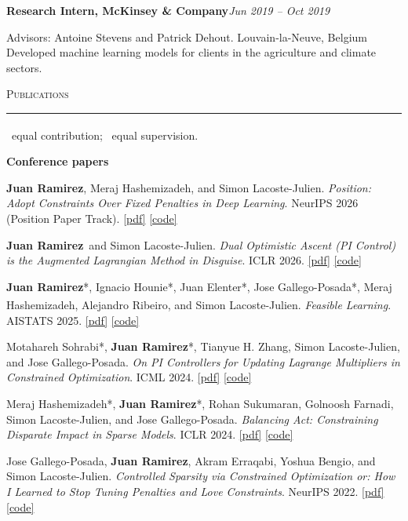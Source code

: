 \documentclass[11pt,letterpaper]{article}
\newcommand{\me}{\textbf{Juan Ramirez}}
\newcommand{\eqc}{*}                        %
\newcommand{\eqs}{\textsuperscript{\dag}}   %
\newcommand{\entry}[3]{%
  \par\addvspace{0.45em}%
  {\noindent\textbf{#1}\hfill\textit{#2}\par}%
  \nobreak\addvspace{0.1em}%
  {\noindent #3\par}%
}
\newcommand{\cvsection}[1]{%
  \par\addvspace{1.1em}%
  \Needspace{4\baselineskip}%
  {\noindent\large\scshape #1\par}%
  \nobreak\vspace{-0.55em}%
  {\noindent\color{rulegray}\rule{\textwidth}{0.4pt}\par}%
  \nobreak\addvspace{0.45em}%
}
\begin{document}
\entry{Research Intern, McKinsey \& Company}{Jun 2019 – Oct 2019}{Advisors: Antoine Stevens and Patrick Dehout. \hfill Louvain-la-Neuve, Belgium \\
Developed machine learning models for clients in the agriculture and climate sectors.}

\cvsection{Publications}

{\small \eqc\ equal contribution; \eqs\ equal supervision.\par}

\textbf{Conference papers}
\begin{enumerate}[label={[C\arabic*]}]
  \item \me, Meraj Hashemizadeh, and Simon Lacoste-Julien. \emph{Position: Adopt Constraints Over Fixed Penalties in Deep Learning}. NeurIPS 2026 (Position Paper Track). \href{https://arxiv.org/abs/2505.20628}{[pdf]} \href{https://github.com/merajhashemi/constraints-vs-penalties}{[code]}
  \item \me\ and Simon Lacoste-Julien. \emph{Dual Optimistic Ascent (PI Control) is the Augmented Lagrangian Method in Disguise}. ICLR 2026. \href{https://arxiv.org/abs/2509.22500}{[pdf]} \href{https://github.com/juan43ramirez/pi-control-is-alm}{[code]}
  \item \me\eqc, Ignacio Hounie\eqc, Juan Elenter\eqc, Jose Gallego-Posada\eqc, Meraj Hashemizadeh, Alejandro Ribeiro\eqs, and Simon Lacoste-Julien\eqs. \emph{Feasible Learning}. AISTATS 2025. \href{https://arxiv.org/abs/2501.14912}{[pdf]} \href{https://github.com/juan43ramirez/feasible-learning}{[code]}
  \item Motahareh Sohrabi\eqc, \me\eqc, Tianyue H. Zhang, Simon Lacoste-Julien, and Jose Gallego-Posada. \emph{On PI Controllers for Updating Lagrange Multipliers in Constrained Optimization}. ICML 2024. \href{https://arxiv.org/abs/2406.04558}{[pdf]} \href{https://github.com/motahareh-sohrabi/nuPI}{[code]}
  \item Meraj Hashemizadeh\eqc, \me\eqc, Rohan Sukumaran, Golnoosh Farnadi, Simon Lacoste-Julien, and Jose Gallego-Posada. \emph{Balancing Act: Constraining Disparate Impact in Sparse Models}. ICLR 2024. \href{https://arxiv.org/abs/2310.20673}{[pdf]} \href{https://github.com/merajhashemi/balancing-act}{[code]}
  \item Jose Gallego-Posada, \me, Akram Erraqabi, Yoshua Bengio, and Simon Lacoste-Julien. \emph{Controlled Sparsity via Constrained Optimization or: How I Learned to Stop Tuning Penalties and Love Constraints}. NeurIPS 2022. \href{https://arxiv.org/abs/2208.04425}{[pdf]} \href{https://github.com/gallego-posada/constrained_sparsity}{[code]}
\end{enumerate}
\end{document}
